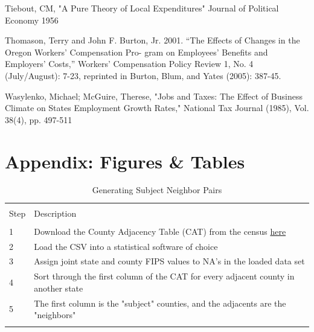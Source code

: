 \documentclass[12pt,a4paper]{article}
\begin{document}
\begin{thebibliography}{99}
Tiebout, CM, "A Pure Theory of Local Expenditures" Journal of Political Economy 1956

Thomason, Terry and John F. Burton, Jr. 2001. “The Effects of Changes in the Oregon Workers’ Compensation Pro-
gram on Employees’ Benefits and Employers’ Costs,” Workers’ Compensation Policy Review 1, No. 4 (July/August): 7-23, reprinted in Burton, Blum, and Yates (2005): 387-45. 

Wasylenko, Michael; McGuire, Therese, "Jobs and Taxes: The Effect of Business Climate on States Employment Growth Rates," National Tax Journal (1985), Vol. 38(4), pp. 497-511
\end{thebibliography}


\section{Appendix: Figures \& Tables}

\begin{table}[!htbp] \centering 
  \caption{Generating Subject Neighbor Pairs} 
  \label{gensubnbr} 
\begin{tabular}{@{\extracolsep{5pt}}ll} 
\\[-1.8ex]\hline 
\hline \\[-1.8ex] 
Step & Description\\ 
\hline \\[-1.8ex] 
1 & Download the County Adjacency Table (CAT) from the census \href{https://www.census.gov/geo/reference/county-adjacency.html}{here} \\
2 & Load the CSV into a statistical software of choice \\
3 & Assign joint state and county FIPS values to NA's in the loaded data set \\
4 & Sort through the first column of the CAT for every adjacent county in another state \\
5 & The first column is the "subject" counties, and the adjacents are the "neighbors" \\
\hline \\[-1.8ex]
\end{tabular} 
\end{table} 
\end{document}
